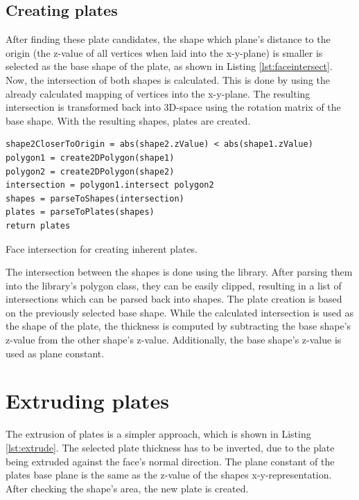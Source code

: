 \documentclass[../ClassicThesis.tex]{subfiles}
\begin{document}
\subsection{Creating plates}

After finding these plate candidates, the shape which plane's distance to the origin (the z-value of all vertices when laid into the x-y-plane) is smaller is selected as the base shape of the plate, as shown in Listing \ref{lst:faceintersect}. Now, the intersection of both shapes is calculated. This is done by using the already calculated mapping of vertices into the x-y-plane. The resulting intersection is transformed back into 3D-space using the rotation matrix of the base shape. With the resulting shapes, plates are created.

\begin{listing}
\begin{verbatim}
shape2CloserToOrigin = abs(shape2.zValue) < abs(shape1.zValue)
polygon1 = create2DPolygon(shape1)
polygon2 = create2DPolygon(shape2)
intersection = polygon1.intersect polygon2
shapes = parseToShapes(intersection)
plates = parseToPlates(shapes)
return plates
\end{verbatim}
\caption{Face intersection for creating inherent plates.}
\label{lst:faceintersect}
\end{listing}

The intersection between the shapes is done using the \jsclipper library. After parsing them into the library's polygon class, they can be easily clipped, resulting in a list of intersections which can be parsed back into shapes. The plate creation is based on the previously selected base shape. While the calculated intersection is used as the shape of the plate, the thickness is computed by subtracting the base shape's z-value from the other shape's z-value. Additionally, the base shape's z-value is used as plane constant.

\section{Extruding plates}\label{sec:extrudedplates}

The extrusion of plates is a simpler approach, which is shown in Listing \ref{lst:extrude}. The selected plate thickness has to be inverted, due to the plate being extruded against the face's normal direction. The plane constant of the plates base plane is the same as the z-value of the shapes x-y-representation. After checking the shape's area, the new plate is created.
\end{document}
